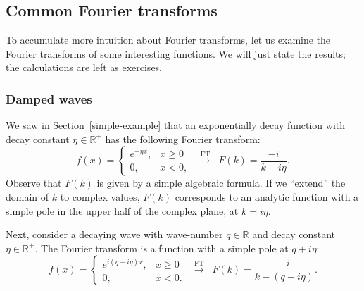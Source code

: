 \documentclass[10pt,a4paper]{article}
\begin{document}
\subsection{Common Fourier transforms}
\label{common-fourier-transforms}

To accumulate more intuition about Fourier transforms, let us examine
the Fourier transforms of some interesting functions. We will just
state the results; the calculations are left as exercises.

\subsubsection{Damped waves}
\label{damped-waves}

We saw in Section~\ref{simple-example} that an exponentially decay
function with decay constant $\eta \in \mathbb{R}^+$ has the following
Fourier transform:
\begin{equation}
  f(x) = \left\{\begin{array}{cl}e^{-\eta x}, & x \ge 0 \\
  0, & x < 0,\end{array}\right. \;\;
  \overset{\mathrm{FT}}{\longrightarrow} \;\; F(k) = \frac{-i}{k-i\eta}.
\end{equation}
Observe that $F(k)$ is given by a simple algebraic formula. If we
``extend'' the domain of $k$ to complex values, $F(k)$ corresponds to
an analytic function with a simple pole in the upper half of the
complex plane, at $k = i\eta$.

Next, consider a decaying wave with wave-number $q \in \mathbb{R}$ and
decay constant $\eta \in \mathbb{R}^+$. The Fourier transform is a
function with a simple pole at $q + i \eta$:
\begin{equation}
f(x) = \left\{\begin{array}{cl}e^{i (q + i\eta) x}, & x \ge 0 \\ 0, & x < 0.\end{array}\right. \;\;  \overset{\mathrm{FT}}{\longrightarrow} \;\; F(k) = \frac{-i}{k-(q + i\eta)}.
\end{equation}
    
\end{document}
